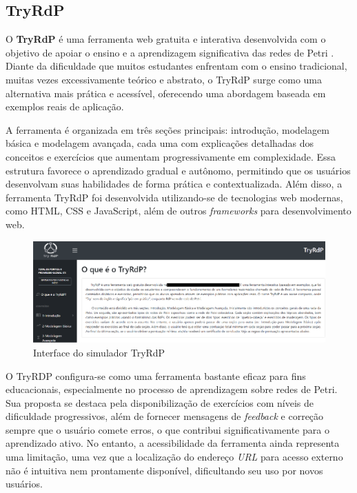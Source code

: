 \documentclass[
	12pt,				%
	openright,			%
	oneside,			%
	a4paper,			%
	english,			%
	brazil				%
	]{abntex2}
\begin{document}
\subsection*{TryRdP}

O \textbf{TryRdP} é uma ferramenta web gratuita e interativa desenvolvida com o objetivo de apoiar o ensino e a aprendizagem significativa das redes de Petri \cite{educomp}. Diante da dificuldade que muitos estudantes enfrentam com o ensino tradicional, muitas vezes excessivamente teórico e abstrato, o TryRdP surge como uma alternativa mais prática e acessível, oferecendo uma abordagem baseada em exemplos reais de aplicação. 

A ferramenta é organizada em três seções principais: introdução, modelagem básica e modelagem avançada, cada uma com explicações detalhadas dos conceitos e exercícios que aumentam progressivamente em complexidade. Essa estrutura favorece o aprendizado gradual e autônomo, permitindo que os usuários desenvolvam suas habilidades de forma prática e contextualizada. Além disso, a ferramenta TryRdP foi desenvolvida utilizando-se de tecnologias web modernas, como HTML, CSS e JavaScript, além de outros \textit{frameworks} para desenvolvimento web.

\begin{figure}[ht] 
	\centering
	\includegraphics[scale=0.40]{figuras/tryrdpInterface.png}
	\caption[Interface do simulador TryRdP]{Interface do simulador TryRdP}
	\label{fig:interfaceTryRdP}
\end{figure}
\FloatBarrier

O TryRDP configura-se como uma ferramenta bastante eficaz para fins educacionais, especialmente no processo de aprendizagem sobre redes de Petri. Sua proposta se destaca pela disponibilização de exercícios com níveis de dificuldade progressivos, além de fornecer mensagens de \textit{feedback} e correção sempre que o usuário comete erros, o que contribui significativamente para o aprendizado ativo. No entanto, a acessibilidade da ferramenta ainda representa uma limitação, uma vez que a localização do endereço \textit{URL} para acesso externo não é intuitiva nem prontamente disponível, dificultando seu uso por novos usuários.
\end{document}
